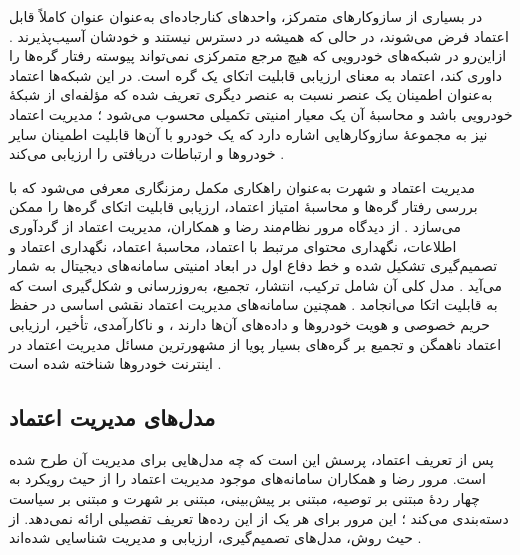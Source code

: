 \documentclass[12pt,a4paper]{article}
\begin{document}
در بسیاری از سازوکار‌های متمرکز، واحد‌های کنارجاده‌ای به‌عنوان عنوان کاملاً قابل اعتماد فرض می‌شوند، در حالی که همیشه در دسترس نیستند و خودشان آسیب‌پذیرند \cite{farsimadanReviewSecurityChallenges2025}. ازاین‌رو در شبکه‌های خودرویی که هیچ مرجع متمرکزی نمی‌تواند پیوسته رفتار گره‌ها را داوری کند، اعتماد به معنای ارزیابی قابلیت اتکای یک گره است. در این شبکه‌ها اعتماد به‌عنوان اطمینان یک عنصر نسبت به عنصر دیگری تعریف شده که مؤلفه‌ای از شبکهٔ خودرویی باشد و محاسبهٔ آن یک معیار امنیتی تکمیلی محسوب می‌شود \cite{farsimadanReviewSecurityChallenges2025}؛ مدیریت اعتماد نیز به مجموعهٔ سازوکار‌هایی اشاره دارد که یک خودرو با آن‌ها قابلیت اطمینان سایر خودرو‌ها و ارتباطات دریافتی را ارزیابی می‌کند \cite{farsimadanReviewSecurityChallenges2025}.

مدیریت اعتماد و شهرت به‌عنوان راهکاری مکمل رمزنگاری معرفی می‌شود که با بررسی رفتار گره‌ها و محاسبهٔ امتیاز اعتماد، ارزیابی قابلیت اتکای گره‌ها را ممکن می‌سازد \cite{razaBlockchainBasedReputationTrust2024}. از دیدگاه مرور نظام‌مند رضا و همکاران، مدیریت اعتماد از گردآوری اطلاعات، نگهداری محتوای مرتبط با اعتماد، محاسبهٔ اعتماد، نگهداری اعتماد و تصمیم‌گیری تشکیل شده و خط دفاع اول در ابعاد امنیتی سامانه‌های دیجیتال به شمار می‌آید \cite{razaBlockchainBasedReputationTrust2024}. مدل کلی آن شامل ترکیب، انتشار، تجمیع، به‌روزرسانی و شکل‌گیری است که به قابلیت اتکا می‌انجامد \cite{razaBlockchainBasedReputationTrust2024}. همچنین سامانه‌های مدیریت اعتماد نقشی اساسی در حفظ حریم خصوصی و هویت خودرو‌ها و داده‌های آن‌ها دارند \cite{razaBlockchainBasedReputationTrust2024}، و ناکارآمدی، تأخیر، ارزیابی اعتماد ناهمگن و تجمیع بر گره‌های بسیار پویا از مشهورترین مسائل مدیریت اعتماد در اینترنت خودرو‌ها شناخته شده است \cite{razaBlockchainBasedReputationTrust2024}.

\subsection{مدل‌های مدیریت اعتماد}

پس از تعریف اعتماد، پرسش این است که چه مدل‌هایی برای مدیریت آن طرح شده است. مرور رضا و همکاران سامانه‌های موجود مدیریت اعتماد را از حیث رویکرد به چهار ردهٔ مبتنی بر توصیه، مبتنی بر پیش‌بینی، مبتنی بر شهرت و مبتنی بر سیاست دسته‌بندی می‌کند \cite{razaBlockchainBasedReputationTrust2024}؛ این مرور برای هر یک از این رده‌ها تعریف تفصیلی ارائه نمی‌دهد. از حیث روش، مدل‌های تصمیم‌گیری، ارزیابی و مدیریت شناسایی شده‌اند \cite{razaBlockchainBasedReputationTrust2024}.
\end{document}
